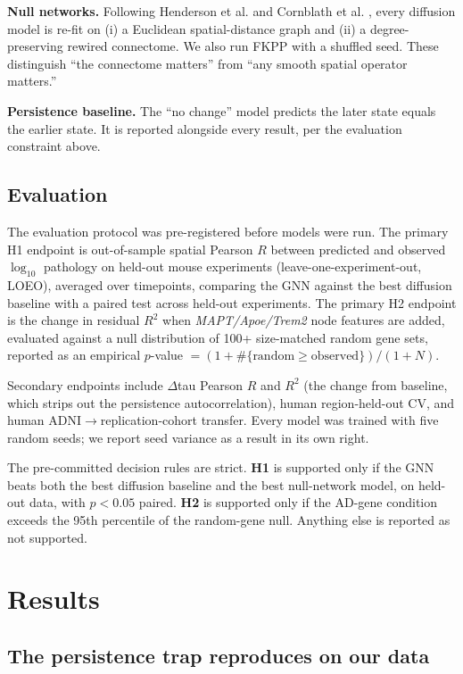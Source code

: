 \documentclass{article}
\begin{document}
\textbf{Null networks.} Following Henderson et al. \cite{henderson2019} and Cornblath et al. \cite{cornblath2021}, every diffusion model is re-fit on (i) a Euclidean spatial-distance graph and (ii) a degree-preserving rewired connectome. We also run FKPP with a shuffled seed. These distinguish ``the connectome matters'' from ``any smooth spatial operator matters.''

\textbf{Persistence baseline.} The ``no change'' model predicts the later state equals the earlier state. It is reported alongside every result, per the evaluation constraint above.

\subsection{Evaluation}

The evaluation protocol was pre-registered before models were run. The primary H1 endpoint is out-of-sample spatial Pearson $R$ between predicted and observed $\log_{10}$ pathology on held-out mouse experiments (leave-one-experiment-out, LOEO), averaged over timepoints, comparing the GNN against the best diffusion baseline with a paired test across held-out experiments. The primary H2 endpoint is the change in residual $R^2$ when \textit{MAPT/Apoe/Trem2} node features are added, evaluated against a null distribution of 100+ size-matched random gene sets, reported as an empirical $p$-value $= (1 + \#\{\text{random} \geq \text{observed}\}) / (1 + N)$.

Secondary endpoints include $\Delta$tau Pearson $R$ and $R^2$ (the change from baseline, which strips out the persistence autocorrelation), human region-held-out CV, and human ADNI$\rightarrow$replication-cohort transfer. Every model was trained with five random seeds; we report seed variance as a result in its own right.

The pre-committed decision rules are strict. \textbf{H1} is supported only if the GNN beats both the best diffusion baseline and the best null-network model, on held-out data, with $p < 0.05$ paired. \textbf{H2} is supported only if the AD-gene condition exceeds the 95th percentile of the random-gene null. Anything else is reported as not supported.

\section{Results}

\subsection{The persistence trap reproduces on our data}
\end{document}
